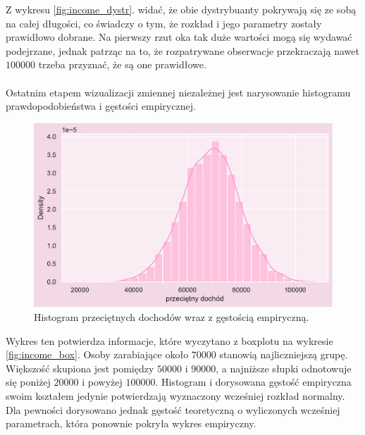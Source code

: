 \documentclass{article}
\begin{document}
\noindent Z wykresu \ref{fig:income_dystr}. widać, że obie dystrybuanty pokrywają się ze sobą na całej długości, co świadczy o tym, że rozkład i jego parametry zostały prawidłowo dobrane. Na pierwszy rzut oka tak duże wartości mogą się wydawać podejrzane, jednak patrząc na to, że rozpatrywane obserwacje przekraczają nawet $100 000$ trzeba przyznać, że są one prawidłowe.\\\\

\noindent Ostatnim etapem wizualizacji zmiennej niezależnej jest narysowanie histogramu prawdopodobieństwa i gęstości empirycznej.

    \begin{figure}[H]
	\begin{center}
		\includegraphics[scale=0.68]{images/income_hist.pdf}
		\caption{Histogram przeciętnych dochodów wraz z gęstością empiryczną.}
		\label{denistyx}
	\end{center}
	\end{figure}

 \noindent Wykres ten potwierdza informacje, które wyczytano z boxplotu na wykresie \ref{fig:income_box}. Osoby zarabiające około $70000$ stanowią najliczniejszą grupę. Większość skupiona jest pomiędzy $50000$ i $90000$, a najniższe słupki odnotowuje się poniżej $20000$ i powyżej $100 000$. Histogram i dorysowana gęstość empiryczna swoim kształem jedynie potwierdzają wyznaczony wcześniej rozkład normalny. Dla pewności dorysowano jednak gęstość teoretyczną o wyliczonych wcześniej parametrach, która ponownie pokryła wykres empiryczny.
 
\end{document}
